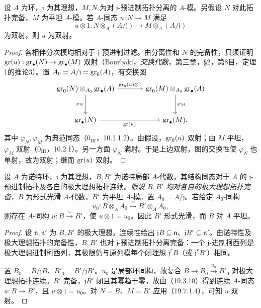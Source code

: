 设 $A$ 为环，$\mathfrak j$ 为其理想，$M,N$ 为对 $\mathfrak j$-预进制拓扑分离的 $A$-模。另假设 $N$ 对此拓扑完备，$M$ 为平坦 $A$-模。若 $A$-同态 $u:N\to M$ 满足
\[
 u\otimes1:N\otimes_A(A/\mathfrak j)\longrightarrow M\otimes_A(A/\mathfrak j)
\]
为双射，则 $u$ 为双射。

\begin{proof}
各相伴分次模均相对于 $\mathfrak j$-预进制过滤。由分离性和 $N$ 的完备性，只须证明 $\operatorname{gr}(u):\operatorname{gr}_\bullet(N)\to\operatorname{gr}_\bullet(M)$ 双射（Bourbaki，\textit{交换代数}，第三章，§2，第8目，定理1的推论3）。置 $A_0=A/\mathfrak j=\operatorname{gr}_0(A)$，有交换图
\[
\begin{tikzcd}[column sep=large,row sep=large]
\gr_0(N)\otimes_{A_0}\gr_\bullet(A)
 \arrow[r,"\gr_0(u)\otimes1"]\arrow[d,"\varphi_N"'] &
\gr_0(M)\otimes_{A_0}\gr_\bullet(A)\arrow[d,"\varphi_M"]\\
\gr_\bullet(N)\arrow[r,"\gr(u)"']&\gr_\bullet(M).
\end{tikzcd}
\]
其中 $\varphi_N,\varphi_M$ 为典范同态（$0_{\mathrm{III}}$，10.1.1.2）。由假设，$\operatorname{gr}_0(u)$ 双射；由 $M$ 平坦，$\varphi_M$ 双射（$0_{\mathrm{III}}$，10.2.1）。另一方面 $\varphi_N$ 满射。于是上边双射，图的交换性使 $\varphi_N$ 也单射，故为双射；继而 $\operatorname{gr}(u)$ 双射。
\end{proof}

设 $A$ 为诺特环，$\mathfrak j$ 为其理想，$B,B'$ 为诺特局部 $A$-代数，其结构同态对于 $A$ 的 $\mathfrak j$-预进制拓扑及各自的极大理想拓扑连续。\emph{假设 $B,B'$ 均对各自的极大理想拓扑完备}，$B$ 为形式光滑 $A$-代数，$B'$ 为平坦 $A$-模。置 $A_0=A/\mathfrak j$。若给定 $A_0$-同构
\[
 u_0:B\otimes_AA_0\xrightarrow{\sim}B'\otimes_AA_0,
\]
则存在 $A$-同构 $u:B\xrightarrow{\sim}B'$，使 $u\otimes1=u_0$。因此 $B'$ 形式光滑，而 $B$ 对 $A$ 平坦。

\begin{proof}
设 $\mathfrak n,\mathfrak n'$ 为 $B,B'$ 的极大理想。连续性给出 $\mathfrak jB\subseteq\mathfrak n$、$\mathfrak jB'\subseteq\mathfrak n'$。由诺特性及极大理想拓扑的完备性，$B,B'$ 也对 $\mathfrak j$-预进制拓扑分离完备：一个 $\mathfrak j$-进制柯西列是极大理想进制柯西列，其极限仍与原列模每个闭理想 $\mathfrak j^rB$（或 $\mathfrak j^rB'$）相同。

置 $B_0=B/\mathfrak jB$、$B'_0=B'/\mathfrak jB'$。$u_0$ 是局部环同构，故复合 $B\to B_0\xrightarrow{u_0}B'_0$ 对极大理想拓扑连续。$B'$ 完备，$\mathfrak jB'$ 闭且其幂趋于零，故由（19.3.10）得到连续 $A$-同态 $u:B\to B'$，且 $u\otimes1=u_0$。对 $N=B$、$M=B'$ 应用（19.7.1.4），可知 $u$ 双射。
\end{proof}

